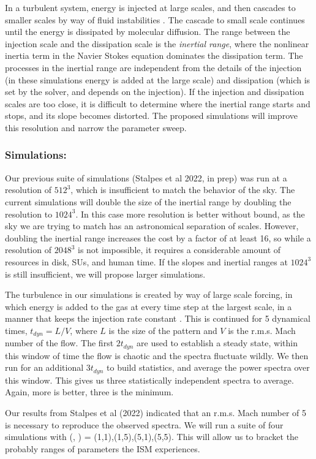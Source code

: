 In a turbulent system, energy is injected at large scales, and then cascades to
smaller scales by way of fluid instabilities \citep{Frisch95}.  The cascade to
small scale continues until the energy is dissipated by molecular diffusion.
The range between the injection scale and the dissipation scale is the
\emph{inertial range}, where the nonlinear inertia term in the Navier Stokes equation
dominates the dissipation term.  The processes in the inertial range are
independent from the details of the injection (in these simulations energy is added at the
large scale) and dissipation (which is set by the solver, and depends on the
injection).  If the injection and dissipation scales are too close, it is
difficult to determine where the inertial range starts and stops, and its slope
becomes distorted.  The proposed simulations will improve this resolution and
narrow the parameter sweep.


\subsubsection{Simulations: \nameCMB}
\label{subsec.cmb_sims}

Our previous suite of simulations (Stalpes et al 2022, in prep) was run at a
resolution of  $512^3$, which is insufficient to match the behavior of the sky.
The current simulations will double the size of the inertial range by doubling
the resolution to $1024^3$.  In this case more resolution is better without
bound, as the sky we are trying to match has an astronomical separation of scales. However, doubling
the inertial range increases the cost by a factor of at least 16, so while a
resolution of $2048^3$ is not impossible, it requires a considerable amount of
resources in disk, SUs, and human time.  If the slopes and inertial ranges at
$1024^3$ is still insufficient, we will propose larger simulations.

The turbulence in our simulations is created by way of large scale forcing, in
which energy is added to the gas at every time step at the largest scale, in a
manner that keeps the injection rate constant \citep{MacLow99, Schmidt09}.  This is
continued for 5 dynamical times, $t_{dyn}=L/V$, where $L$ is the size of the
pattern and $V$ is the r.m.s. Mach number of the flow.  The first $2 t_{dyn}$
are used to establish a steady state, within this window of time the flow is
chaotic and the spectra fluctuate wildly.  We then run for an additional $3 t_{dyn}$ to build statistics, and
average the power spectra over this window.  This gives us three statistically
independent spectra to average.  Again, more is better, three is the minimum.  

Our results from Stalpes et al (2022) indicated that an r.m.s. Mach number of 5
is necessary to reproduce the observed spectra.  We will run a suite of four
simulations with (\mach, \alfmach) = (1,1),(1,5),(5,1),(5,5).  This will allow
us to bracket the probably ranges of parameters the ISM experiences.
